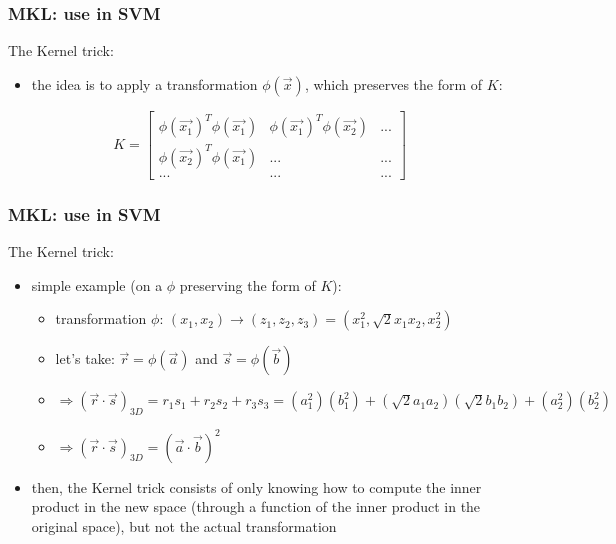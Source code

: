\documentclass{beamer}
\begin{document}
\begin{frame}
\frametitle{MKL: use in SVM}

The Kernel trick:

\begin{itemize}
\item the idea is to apply a transformation $\phi(\vec{x})$, which preserves the form of $K$:
\end{itemize}

\[
K=
  \begin{bmatrix}
    \phi(\vec{x_{1}})^{T}\phi(\vec{x_{1}}) & \phi(\vec{x_{1}})^{T}\phi(\vec{x_{2}}) & ...  \\
    \phi(\vec{x_{2}})^{T}\phi(\vec{x_{1}}) & ... & ...  \\
    ... & ... & ...
  \end{bmatrix}
\]

\end{frame}


\begin{frame}
\frametitle{MKL: use in SVM}

The Kernel trick:

\begin{itemize}
\item simple example (on a $\phi$ preserving the form of $K$):

\begin{itemize}
\item transformation $\phi$: $(x_{1}, x_{2})\rightarrow (z_{1}, z_{2}, z_{3}) = (x_{1}^{2}, \sqrt{2}x_{1}x_{2}, x_{2}^{2})$
\item let's take: $\vec{r} = \phi(\vec{a})$ and $\vec{s} = \phi(\vec{b})$
\item $\Rightarrow (\vec{r}\cdot\vec{s})_{3D} = r_{1}s_{1}+r_{2}s_{2}+r_{3}s_{3} = (a_{1}^{2})(b_{1}^{2})+(\sqrt{2}a_{1}a_{2})(\sqrt{2}b_{1}b_{2})+(a_{2}^{2})(b_{2}^{2})$
\item $\Rightarrow (\vec{r}\cdot\vec{s})_{3D} = (\vec{a}\cdot\vec{b})^{2}$
\end{itemize}

\item then, the Kernel trick consists of only knowing how to compute the inner product in the new space (through a function of the inner product in the original space), but not the actual transformation
\end{itemize}

\end{frame}
\end{document}
